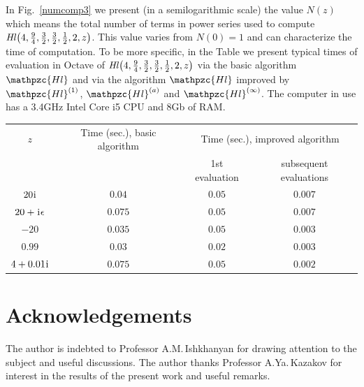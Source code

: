 \documentclass[11pt]{article}
\newcommand{\MF}[1]{\mathop{#1}\nolimits}
\newcommand{\ii}{\kern0.05em\mathrm{i}\kern0.05em} \newcommand{\E}[1]{\textrm{e}^{#1}}
\def\HeunL{\MF{\textit{Hl\/}}}%
\def\psHeunLfin{\mathpzc{Hl}}%
\def\psHeunLnearone{\mathpzc{Hl}^{(1)}}%
\def\psHeunLneara{\mathpzc{Hl}^{(a)}}%
\def\psHeunLnearinf{\mathpzc{Hl}^{(\infty)}}%
\begin{document}
In Fig.~\ref{numcomp3} we present (in a semilogarithmic scale) the value $N(z)$
which means the total number of terms in power series used to compute
$\HeunL\bigl(4,\frac94,\frac32,\frac32,\frac12,2,z\bigr)$. This value varies
from $N(0)=1$ and can characterize the time of computation. To be more specific,
in the Table we present typical times of evaluation in Octave of
$\HeunL\bigl(4,\frac94,\frac32,\frac32,\frac12,2,z\bigr)$ via the basic
algorithm $\psHeunLfin$ and via the algorithm $\psHeunLfin$ improved by
$\psHeunLnearone$, $\psHeunLneara$ and $\psHeunLnearinf$. The computer in use
has a 3.4\;GHz Intel Core i5 CPU and 8\;Gb of RAM.
\begin{table}[h]
\begin{center}
\begin{tabular}{c|c|c|c}
 $z$ & Time (sec.), basic algorithm & \multicolumn{2}{c}{Time (sec.), improved algorithm}    \\
  &  & 1st evaluation & subsequent evaluations  \\\midrule
 $20\ii$ & $0.04$ & $0.05$ & $0.007$\\
 $20+\ii\epsilon$ & $0.075$ & $0.05$ & $0.007$\\
 $-20$ & $0.035$ & $0.05$ & $0.003$\\
 $0.99$ & $0.03$ & $0.02$ & $0.003$\\
 $4+0.01\ii$ & $0.075$ & $0.05$ & $0.002$  
\end{tabular}
\end{center}
\end{table}

\vspace{-6mm}

\section*{Acknowledgements} The author is indebted to Professor A.M.\,Ishkhanyan
for drawing attention to the subject and useful discussions. The author thanks
Professor A.Ya.\,Kazakov for interest in the results of the present work
and useful remarks.
\end{document}
